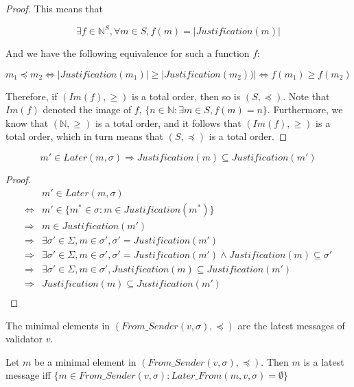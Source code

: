 \begin{proof}
This means that

$$
\exists f \in \mathbb{N}^S, \forall m \in S, f(m) = |Justification(m)|
$$

And we have the following equivalence for such a function $f$:

$$
m_1 \preceq m_2 \iff |Justification(m_1)| \geq |Justification(m_2))| \iff f(m_1) \geq f(m_2)
$$

Therefore, if $(Im(f), \geq)$ is a total order, then so is $(S, \preceq)$. Note that $Im(f)$ denoted the image of $f$, $\{n \in \mathbb{N}: \exists m \in S, f(m) = n\}$. Furthermore, we know that $(\mathbb{N}, \geq)$ is a total order, and it follows that $(Im(f), \geq)$ is a total order, which in turn means that $(S, \preceq)$ is a total order.
\end{proof}

\begin{lemma}
  $$
  m' \in Later(m, \sigma) \Longrightarrow Justification(m) \subseteq Justification(m')
  $$
\end{lemma}

\begin{proof}
  \begin{align*}
    &m' \in Later(m, \sigma) \\
    \Longleftrightarrow& m' \in \{m^* \in \sigma :  m \in Justification(m^*) \} \\
    \Longrightarrow& m \in Justification(m') \\
    \Longrightarrow& \exists \sigma' \in \Sigma, m \in \sigma', \sigma' = Justification(m') \\
    \Longrightarrow& \exists \sigma' \in \Sigma, m \in \sigma', \sigma' = Justification(m') \land Justification(m) \subseteq \sigma' \\
    \Longrightarrow& \exists \sigma' \in \Sigma, m \in \sigma', Justification(m) \subseteq Justification(m') \\
    \Longrightarrow& Justification(m) \subseteq Justification(m') \\
  \end{align*}
\end{proof}

\begin{lemma}
The minimal elements in $(From\_Sender(v, \sigma), \preceq)$ are the latest messages of validator $v$.
\end{lemma}

Let $m$ be a minimal element in $(From\_Sender(v, \sigma), \preceq)$. Then $m$ is a latest message iff $\{m \in From\_Sender(v, \sigma):  Later\_From(m, v, \sigma) = \emptyset \}$

